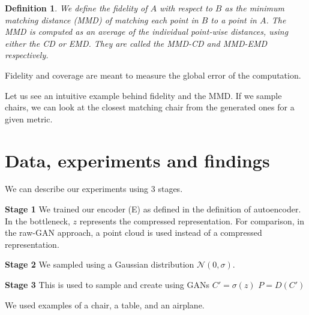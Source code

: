 \documentclass[12pt]{article}
\newtheorem{definition}{Definition}
\newcommand{\contentdescription}[1]{}
\begin{document}
    \begin{definition}
        We define the \emph{fidelity} of $A$ with respect to $B$ as the \emph{minimum matching distance} (MMD) of matching each point in $B$ to a point in $A$.
        The \emph{MMD} is computed as an average of the individual point-wise distances, using either the CD or EMD.
        They are called the \emph{MMD-CD} and \emph{MMD-EMD} respectively.
    \end{definition}

    Fidelity and coverage are meant to measure the global error of the computation.

    Let us see an intuitive example behind fidelity and the MMD.
    If we sample chairs, we can look at the closest matching chair from the generated ones for a given metric.


    \section{Data, experiments and findings}
    \contentdescription{
        Data, experiments and findings (30-40\%):
        Describe the data you are working with for your project.
        What type of data is it?
        Where did it come from?
        How much data are you working with?
        Did you have to do any preprocessing, filtering, or other special treatment to use this data in your project?
        Describe and present the experiments that you performed and what is the reason for those experiments.
        Where applicable define evaluation metrics that you used. Discuss the results that you got.
    }

    We can describe our experiments using 3 stages.

    \textbf{Stage 1}
    We trained our encoder (E) as defined in the definition of autoencoder.
    In the bottleneck, $z$ represents the compressed representation.
    For comparison, in the raw-GAN approach, a point cloud is used instead of a compressed representation.

    \textbf{Stage 2}
    We sampled using a Gaussian distribution $\mathcal{N}(0,\sigma)$.

    \textbf{Stage 3}
    This is used to sample and create using GANs
    $C' = \sigma(z)$
    $P = D(C')$

    We used examples of a chair, a table, and an airplane.
\end{document}
